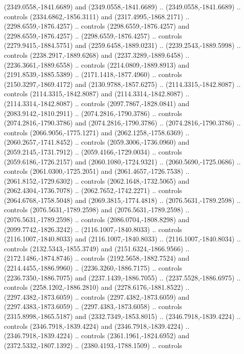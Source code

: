 \begin{scope}[shift={(-24.70323,-217.37029)}]
\begin{scope}[shift={(-1886.1309,2235.3934)}]
\begin{scope}[cm={{0.35985,0.0,0.0,0.35985,(1425.5269,-1101.8372)}}]
        (2349.0558,-1841.6689) and (2349.0558,-1841.6689) .. (2349.0558,-1841.6689) ..
        controls (2334.6862,-1856.3111) and (2317.4995,-1868.2171) ..
        (2298.6559,-1876.4257) .. controls (2298.6559,-1876.4257) and
        (2298.6559,-1876.4257) .. (2298.6559,-1876.4257) .. controls
        (2279.9415,-1884.5751) and (2259.6458,-1889.0231) .. (2239.2543,-1889.5998) ..
        controls (2238.2917,-1889.6268) and (2237.3289,-1889.6458) ..
        (2236.3661,-1889.6558) .. controls (2214.0809,-1889.8913) and
        (2191.8539,-1885.5389) .. (2171.1418,-1877.4960) .. controls
        (2150.3297,-1869.4172) and (2130.9788,-1857.6275) .. (2114.3315,-1842.8087) ..
        controls (2114.3315,-1842.8087) and (2114.3314,-1842.8087) ..
        (2114.3314,-1842.8087) .. controls (2097.7867,-1828.0841) and
        (2083.9142,-1810.2911) .. (2074.2816,-1790.3786) .. controls
        (2074.2816,-1790.3786) and (2074.2816,-1790.3786) .. (2074.2816,-1790.3786) ..
        controls (2066.9056,-1775.1271) and (2062.1258,-1758.6369) ..
        (2060.2657,-1741.8452) .. controls (2059.3006,-1736.0960) and
        (2059.2145,-1731.7912) .. (2059.4166,-1729.0034) .. controls
        (2059.6186,-1726.2157) and (2060.1080,-1724.9321) .. (2060.5690,-1725.0686) ..
        controls (2061.0300,-1725.2051) and (2061.4657,-1726.7538) ..
        (2061.8152,-1729.6302) .. controls (2062.1648,-1732.5065) and
        (2062.4304,-1736.7078) .. (2062.7652,-1742.2271) .. controls
        (2064.6768,-1758.5048) and (2069.3815,-1774.4818) .. (2076.5631,-1789.2598) ..
        controls (2076.5631,-1789.2598) and (2076.5631,-1789.2598) ..
        (2076.5631,-1789.2598) .. controls (2086.0704,-1808.8298) and
        (2099.7742,-1826.3242) .. (2116.1007,-1840.8033) .. controls
        (2116.1007,-1840.8033) and (2116.1007,-1840.8033) .. (2116.1007,-1840.8034) ..
        controls (2132.5343,-1855.3749) and (2151.6324,-1866.9566) ..
        (2172.1486,-1874.8746) .. controls (2192.5658,-1882.7524) and
        (2214.4455,-1886.9960) .. (2236.3260,-1886.7175) .. controls
        (2236.7350,-1886.7075) and (2237.1439,-1886.7055) .. (2237.5528,-1886.6975) ..
        controls (2258.1202,-1886.2810) and (2278.6176,-1881.8522) ..
        (2297.4382,-1873.6059) .. controls (2297.4382,-1873.6059) and
        (2297.4383,-1873.6059) .. (2297.4383,-1873.6058) .. controls
        (2315.8998,-1865.5187) and (2332.7349,-1853.8015) .. (2346.7918,-1839.4224) ..
        controls (2346.7918,-1839.4224) and (2346.7918,-1839.4224) ..
        (2346.7918,-1839.4224) .. controls (2361.1961,-1824.6952) and
        (2372.5332,-1807.1392) .. (2380.4193,-1788.1509) .. controls

\end{scope}
\end{scope}
\end{scope}
